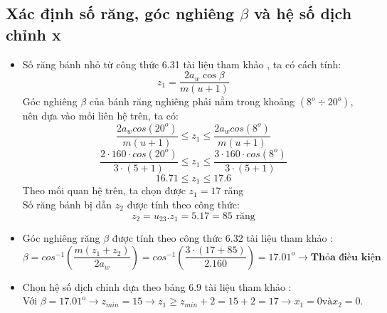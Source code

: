         \subsection{Xác định số răng, góc nghiêng $\beta$ và hệ số dịch chỉnh x}
            \begin{itemize}
                \item Số răng bánh nhỏ từ công thức 6.31 tài liệu tham khảo \cite{tltk1}, ta có cách tính:
                    \begin{equation}
                        z_1 = \frac{2a_{w}\cos{\beta}}{m(u+1)} 
                        \label{eq:3.12}
                    \end{equation}
                    \hspace*{0.6cm}Góc nghiêng $\beta$ của bánh răng nghiêng phải nằm trong khoảng $(8^o \div 20^o)$, nên dựa vào mối liên hệ trên, ta có:
                    $$\frac{2a_wcos(20^o)}{m(u+1)} \leq z_1 \leq \frac{2a_wcos(8^o)}{m(u+1)}$$
                    $$\frac{2 \cdot 160 \cdot cos(20^o)}{3 \cdot (5 + 1)} \leq z_1 \leq \frac{3 \cdot 160 \cdot cos(8^o)}{3 \cdot (5 + 1)}$$
                    $$ 16.71 \leq z_1 \leq 17.6 $$
                    \hspace*{0.6cm}Theo mối quan hệ trên, ta chọn được $z_1 = 17$ răng\\[0.2cm]
                    \hspace*{0.6cm}Số răng bánh bị dẫn $z_2$ được tính theo công thức:
                    \begin{equation}
                        z_2 = u_{23}.z_1 = 5.17 = 85 \text{ răng}
                        \label{eq:3.13}
                    \end{equation}
                \item Góc nghiêng răng $\beta$ được tính theo công thức 6.32 tài liệu tham khảo \cite{tltk1}:
                    $$\beta = cos^{-1}(\frac{m(z_1 + z_2)}{2a_w}) = cos^{-1}(\frac{3 \cdot (17 + 85)}{2.160}) = 17.01^o \rightarrow \textbf{Thỏa điều kiện}$$
                \item Chọn hệ số dịch chỉnh dựa theo bảng 6.9 tài liệu tham khảo \cite{tltk1}:\\
                    Với $\beta = 17.01^o \rightarrow z_{min} = 15 \rightarrow z_1 \geq z_{min} + 2 = 15 + 2 = 17 \rightarrow x_1 = 0 \text{và} x_2 = 0.$ 
            \end{itemize}
